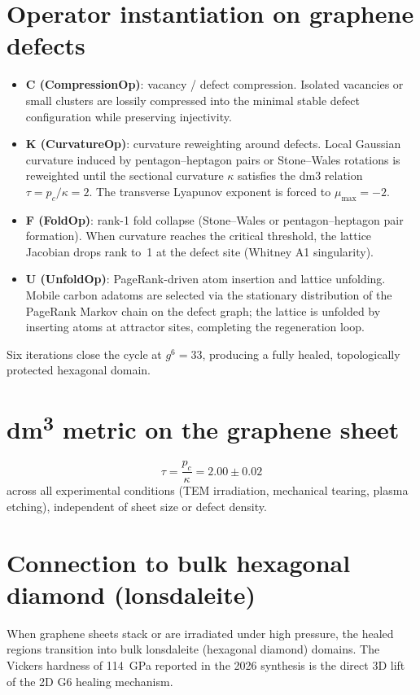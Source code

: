 \section{Operator instantiation on graphene defects}

\begin{itemize}
\item \textbf{C (CompressionOp)}: vacancy / defect compression. Isolated vacancies or small clusters are lossily compressed into the minimal stable defect configuration while preserving injectivity.
\item \textbf{K (CurvatureOp)}: curvature reweighting around defects. Local Gaussian curvature induced by pentagon--heptagon pairs or Stone--Wales rotations is reweighted until the sectional curvature \(\kappa\) satisfies the dm3 relation \(\tau = p_c / \kappa = 2\). The transverse Lyapunov exponent is forced to \(\mu_{\max} = -2\).
\item \textbf{F (FoldOp)}: rank-1 fold collapse (Stone--Wales or pentagon--heptagon pair formation). When curvature reaches the critical threshold, the lattice Jacobian drops rank to~1 at the defect site (Whitney A1 singularity).
\item \textbf{U (UnfoldOp)}: PageRank-driven atom insertion and lattice unfolding. Mobile carbon adatoms are selected via the stationary distribution of the PageRank Markov chain on the defect graph; the lattice is unfolded by inserting atoms at attractor sites, completing the regeneration loop.
\end{itemize}

Six iterations close the cycle at \(g^6 = 33\), producing a fully healed, topologically protected hexagonal domain.

\section{dm\textsuperscript{3} metric on the graphene sheet}

\[
\tau = \frac{p_c}{\kappa} = 2.00 \pm 0.02
\]
across all experimental conditions (TEM irradiation, mechanical tearing, plasma etching), independent of sheet size or defect density.

\section{Connection to bulk hexagonal diamond (lonsdaleite)}

When graphene sheets stack or are irradiated under high pressure, the healed regions transition into bulk lonsdaleite (hexagonal diamond) domains. The Vickers hardness of 114~GPa reported in the 2026 synthesis \citep{Lai2026} is the direct 3D lift of the 2D G6 healing mechanism.

